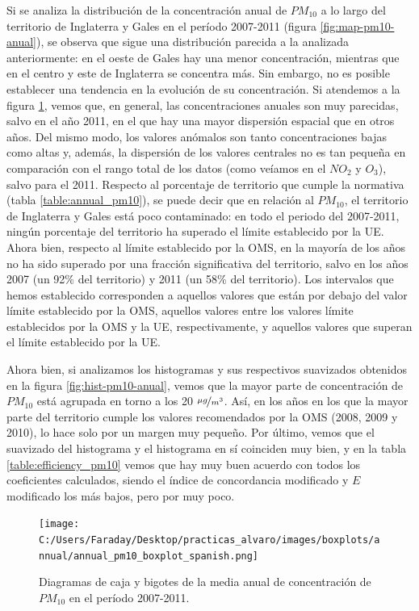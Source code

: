\documentclass[12pt]{article}
\begin{document}
Si se analiza la distribución de la concentración anual de $PM_{10}$ a lo largo del territorio de Inglaterra y Gales en el período 2007-2011 (figura \ref{fig:map-pm10-anual}), se observa que sigue una distribución parecida a la analizada anteriormente: en el oeste de Gales hay una menor concentración, mientras que en el centro y este de Inglaterra se concentra más. Sin embargo, no es posible establecer una tendencia en la evolución de su concentración. Si atendemos a la figura \ref{fig:box_pm10_annual}, vemos que, en general, las concentraciones anuales son muy parecidas, salvo en el año 2011, en el que hay una mayor dispersión espacial que en otros años. Del mismo modo, los valores anómalos son tanto concentraciones bajas como altas y, además, la dispersión de los valores centrales no es tan pequeña en comparación con el rango total de los datos (como veíamos en el $NO_{2}$ y $O_{3}$), salvo para el 2011. Respecto al porcentaje de territorio que cumple la normativa (tabla \ref{table:annual_pm10}), se puede decir que en relación al $PM_{10}$, el territorio de Inglaterra y Gales está poco contaminado: en todo el periodo del 2007-2011, ningún porcentaje del territorio ha superado el límite establecido por la UE. Ahora bien, respecto al límite establecido por la OMS, en la mayoría de los años no ha sido superado por una fracción significativa del territorio, salvo en los años 2007 (un 92\% del territorio) y 2011 (un 58\% del territorio). Los intervalos que hemos establecido corresponden a aquellos valores que están por debajo del valor límite establecido por la OMS, aquellos valores entre los valores límite establecidos por la OMS y la UE, respectivamente, y aquellos valores que superan el límite establecido por la UE.

Ahora bien, si analizamos los histogramas y sus respectivos suavizados obtenidos en la figura \ref{fig:hist-pm10-anual}, vemos que la mayor parte de concentración de $PM_{10}$ está agrupada en torno a los 20 $\nicefrac{\mu g}{m^{3}}$. Así, en los años en los que la mayor parte del territorio cumple los valores recomendados por la OMS (2008, 2009 y 2010), lo hace solo por un margen muy pequeño. Por último, vemos que el suavizado del histograma y el histograma en sí coinciden muy bien, y en la tabla \ref{table:efficiency_pm10} vemos que hay muy buen acuerdo con todos los coeficientes calculados, siendo el índice de concordancia modificado y $E$ modificado los más bajos, pero por muy poco.

\begin{figure}[H]
\centering
\texttt{[image: C:/Users/Faraday/Desktop/practicas\_alvaro/images/boxplots/annual/annual\_pm10\_boxplot\_spanish.png]}
\caption{Diagramas de caja y bigotes de la media anual de concentración de $PM_{10}$ en el período 2007-2011.}
\label{fig:box_pm10_annual}
\end{figure}
\end{document}
